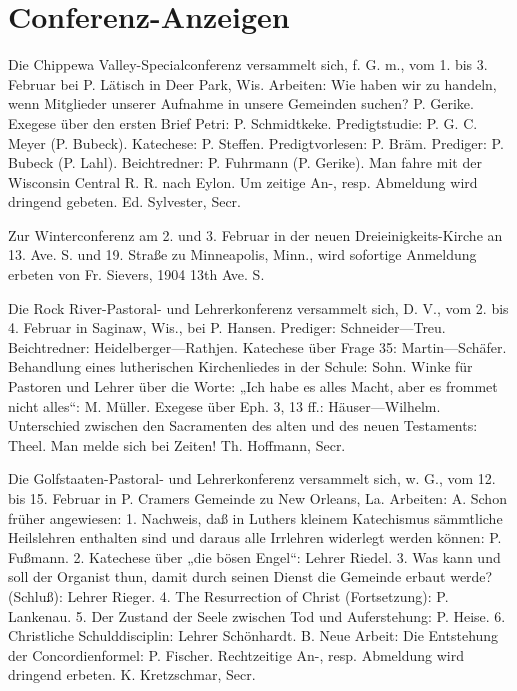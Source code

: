 \chapter{Conferenz-Anzeigen}

Die Chippewa Valley-Specialconferenz versammelt sich, f. G. m., vom 1. bis 3. Februar bei P. Lätisch in Deer Park, Wis. Arbeiten: Wie haben wir zu handeln, wenn Mitglieder unserer Aufnahme in unsere Gemeinden suchen? P. Gerike. Exegese über den ersten Brief Petri: P. Schmidtkeke. Predigtstudie: P. G. C. Meyer (P. Bubeck). Katechese: P. Steffen. Predigtvorlesen: P. Bräm. Prediger: P. Bubeck (P. Lahl). Beichtredner: P. Fuhrmann (P. Gerike). Man fahre mit der Wisconsin Central R. R. nach Eylon. Um zeitige An-, resp. Abmeldung wird dringend gebeten. Ed. Sylvester, Secr.

Zur Winterconferenz am 2. und 3. Februar in der neuen Dreieinigkeits-Kirche an 13. Ave. S. und 19. Straße zu Minneapolis, Minn., wird sofortige Anmeldung erbeten von Fr. Sievers, 1904 13th Ave. S.

Die Rock River-Pastoral- und Lehrerkonferenz versammelt sich, D. V., vom 2. bis 4. Februar in Saginaw, Wis., bei P. Hansen. Prediger: Schneider—Treu. Beichtredner: Heidelberger—Rathjen. Katechese über Frage 35: Martin—Schäfer. Behandlung eines lutherischen Kirchenliedes in der Schule: Sohn. Winke für Pastoren und Lehrer über die Worte: „Ich habe es alles Macht, aber es frommet nicht alles“: M. Müller. Exegese über Eph. 3, 13 ff.: Häuser—Wilhelm. Unterschied zwischen den Sacramenten des alten und des neuen Testaments: Theel. Man melde sich bei Zeiten! Th. Hoffmann, Secr.

Die Golfstaaten-Pastoral- und Lehrerkonferenz versammelt sich, w. G., vom 12. bis 15. Februar in P. Cramers Gemeinde zu New Orleans, La. Arbeiten: A. Schon früher angewiesen: 1. Nachweis, daß in Luthers kleinem Katechismus sämmtliche Heilslehren enthalten sind und daraus alle Irrlehren widerlegt werden können: P. Fußmann. 2. Katechese über „die bösen Engel“: Lehrer Riedel. 3. Was kann und soll der Organist thun, damit durch seinen Dienst die Gemeinde erbaut werde? (Schluß): Lehrer Rieger. 4. The Resurrection of Christ (Fortsetzung): P. Lankenau. 5. Der Zustand der Seele zwischen Tod und Auferstehung: P. Heise. 6. Christliche Schulddisciplin: Lehrer Schönhardt. B. Neue Arbeit: Die Entstehung der Concordienformel: P. Fischer. Rechtzeitige An-, resp. Abmeldung wird dringend erbeten. K. Kretzschmar, Secr.
